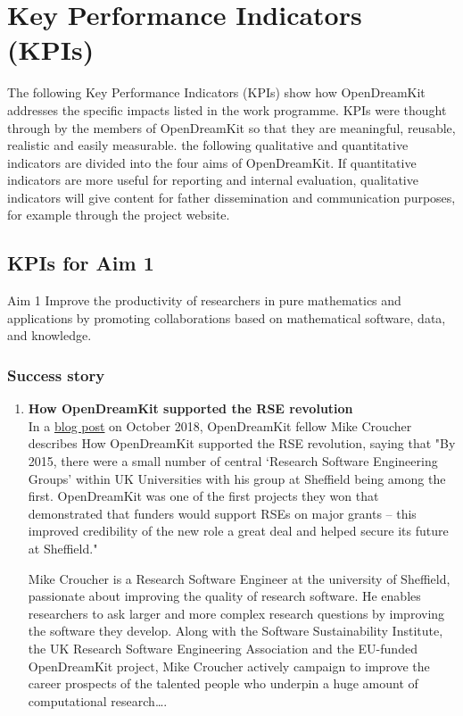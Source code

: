 
\section{Key Performance Indicators (KPIs)}

The following Key Performance Indicators (KPIs) show how OpenDreamKit addresses the specific impacts listed in the work
programme. KPIs were thought through by the members of OpenDreamKit so that they are meaningful, reusable, realistic and easily measurable.
the following qualitative and quantitative indicators are divided into the four aims of OpenDreamKit. If quantitative indicators are more
useful for reporting and internal evaluation, qualitative indicators will give content for father dissemination and communication purposes,
for example through the project website.


\subsection{KPIs for Aim 1}

\begin{recommendation}{Aim 1}
  Improve the productivity of researchers in pure mathematics and
  applications by promoting collaborations based on mathematical
  software, data, and knowledge.
\end{recommendation}

\subsubsection{Success story}

\begin{enumerate}
\item \textbf{How OpenDreamKit supported the RSE revolution}\\
  In a \href{https://opendreamkit.org/2018/10/29/ODK-RSE/}{blog post}
  on October 2018, OpenDreamKit fellow Mike Croucher describes How
  OpenDreamKit supported the RSE revolution, saying that "By 2015,
  there were a small number of central ‘Research Software Engineering
  Groups’ within UK Universities with his group at Sheffield being
  among the first. OpenDreamKit was one of the first projects they won
  that demonstrated that funders would support RSEs on major grants –
  this improved credibility of the new role a great deal and helped
  secure its future at Sheffield."

  \noindent
  Mike Croucher is a Research Software Engineer at the university
  of Sheffield, passionate about improving the quality of research
  software. He enables researchers to ask larger and more complex
  research questions by improving the software they develop. Along
  with the Software Sustainability Institute, the UK Research Software
  Engineering Association and the EU-funded OpenDreamKit project,
  Mike Croucher actively campaign to improve the career prospects
  of the talented people who underpin a huge amount of computational
  research….
\end{enumerate}

